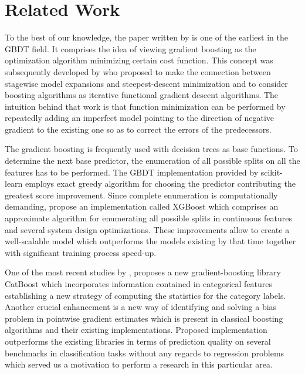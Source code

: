 \section{Related Work}
\label{sec:related-work}

To the best of our knowledge, the paper written by \citet{breiman1997arcing}  is one of the earliest in the GBDT field. It comprises the idea of viewing gradient boosting as the optimization algorithm minimizing certain cost function. This concept was subsequently developed by \citet{friedman2001greedy} who proposed to make the connection between stagewise model expansions and steepest-descent minimization and to consider boosting algorithms as iterative functional gradient descent algorithms. The intuition behind that work is that function minimization can be performed by repeatedly adding an imperfect model pointing to the direction of negative gradient to the existing one so as to correct the errors of the predecessors.

The gradient boosting is frequently used with decision trees as base functions. To determine the next base predictor, the enumeration of all possible splits on all the features has to be performed. The GBDT implementation provided by scikit-learn \cite{scikit-learn} employs exact greedy algorithm for choosing the predictor contributing the greatest score improvement. Since complete enumeration is computationally demanding, \citet{chen2016xgboost} propose an implementation called XGBoost which comprises an approximate algorithm for enumerating all possible splits in continuous features and several system design optimizations. These improvements allow to create a well-scalable model which outperforms the models existing by that time together with significant training process speed-up.

One of the most recent studies by \citet{DBLP:journals/corr/DorogushGGKPV17}, \cite{dorogushcatboost} proposes a new gradient-boosting library CatBoost which incorporates information contained in categorical features establishing a new strategy of computing the statistics for the category labels. Another crucial enhancement is a new way of 
identifying and solving a bias problem in pointwise gradient estimates which is present in classical boosting algorithms and their existing implementations. Proposed implementation outperforms the existing libraries in terms of prediction quality on several benchmarks in classification tasks without any regards to regression problems which served us a motivation to perform a research in this particular area.